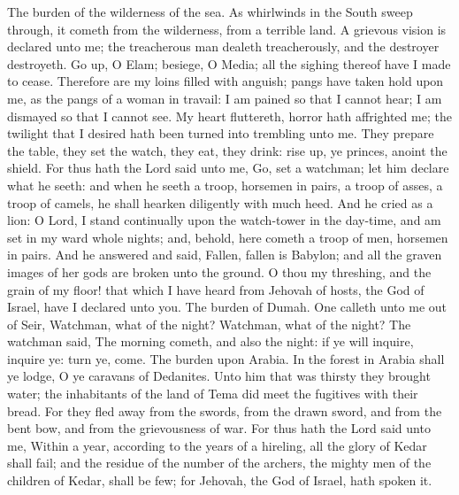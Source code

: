 The burden of the wilderness of the sea. As whirlwinds in the South sweep through, it cometh from the wilderness, from a terrible land. A grievous vision is declared unto me; the treacherous man dealeth treacherously, and the destroyer destroyeth. Go up, O Elam; besiege, O Media; all the sighing thereof have I made to cease. Therefore are my loins filled with anguish; pangs have taken hold upon me, as the pangs of a woman in travail: I am pained so that I cannot hear; I am dismayed so that I cannot see. My heart fluttereth, horror hath affrighted me; the twilight that I desired hath been turned into trembling unto me. They prepare the table, they set the watch, they eat, they drink: rise up, ye princes, anoint the shield. For thus hath the Lord said unto me, Go, set a watchman; let him declare what he seeth: and when he seeth a troop, horsemen in pairs, a troop of asses, a troop of camels, he shall hearken diligently with much heed. And he cried as a lion: O Lord, I stand continually upon the watch-tower in the day-time, and am set in my ward whole nights; and, behold, here cometh a troop of men, horsemen in pairs. And he answered and said, Fallen, fallen is Babylon; and all the graven images of her gods are broken unto the ground.  O thou my threshing, and the grain of my floor! that which I have heard from Jehovah of hosts, the God of Israel, have I declared unto you.  The burden of Dumah. One calleth unto me out of Seir, Watchman, what of the night? Watchman, what of the night? The watchman said, The morning cometh, and also the night: if ye will inquire, inquire ye: turn ye, come.  The burden upon Arabia. In the forest in Arabia shall ye lodge, O ye caravans of Dedanites. Unto him that was thirsty they brought water; the inhabitants of the land of Tema did meet the fugitives with their bread. For they fled away from the swords, from the drawn sword, and from the bent bow, and from the grievousness of war. For thus hath the Lord said unto me, Within a year, according to the years of a hireling, all the glory of Kedar shall fail; and the residue of the number of the archers, the mighty men of the children of Kedar, shall be few; for Jehovah, the God of Israel, hath spoken it. 

